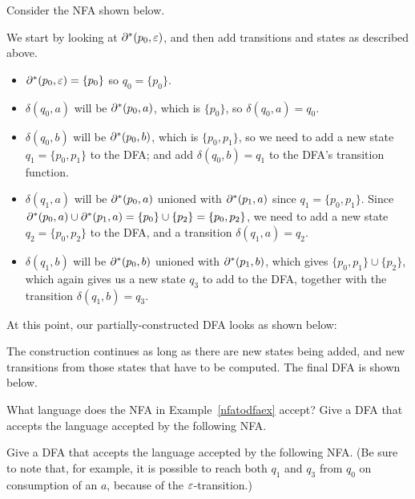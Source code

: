 \begin{example}\label{nfatodfaex}
Consider the NFA shown below.


We start by looking at $\partial^*(p_0, \varepsilon)$, and then add transitions and
states as described above.
\begin{itemize}
\item
$\partial^*(p_0, \varepsilon) = \{p_0\}$ so $q_0 = \{p_0\}$.

\item
$\delta(q_0,a)$ will be $\partial^*(p_0,a)$, which is $\{p_0\}$, 
so $\delta(q_0,a) = q_0$.

\item
$\delta(q_0,b)$ will be $\partial^*(p_0,b)$, which is $\{p_0, p_1\}$,
so we need to add a new state
$q_1 = \{p_0, p_1\}$ to the DFA; and add $\delta(q_0,b) = q_1$ to the DFA's
transition function.

\item
$\delta(q_1,a)$ will be $\partial^*(p_0,a)$ unioned with $\partial^*(p_1,a)$ since
$q_1 = \{p_0, p_1\}$.  Since $\partial^*(p_0,a) \cup \partial^*(p_1,a) = \{p_0\} \cup
\{p_2\} = \{p_0,p_2\}$, we need to add a new state $q_2 = \{p_0, p_2\}$ to the
DFA, and a transition $\delta(q_1,a) = q_2$.

\item 
$\delta(q_1,b)$ will be $\partial^*(p_0,b)$ unioned with $\partial^*(p_1,b)$, which
gives $\{p_0, p_1\} \cup \{p_2\}$, which again gives us a new state $q_3$ to add to
the DFA, together with the transition $\delta(q_1,b) = q_3$.
\end{itemize}

At this point, our partially-constructed DFA looks as shown below:


The construction continues as long as there are new states being added, and new
transitions from those states that have to be computed.
The final DFA is shown below.


\end{example}


\begin{exercises}
\problem What language does the NFA in Example~\ref{nfatodfaex} accept?
\problem Give a DFA that accepts the language accepted by the 
following NFA.

\fsafig{3ex}

\problem Give a DFA that accepts the language accepted by the following NFA.
(Be sure to note that, for example, it is possible to reach both $q_1$ and
$q_3$ from $q_0$ on consumption of an $a$, because of the 
$\varepsilon$-transition.)

\fsafig{4ex}


\end{exercises}




